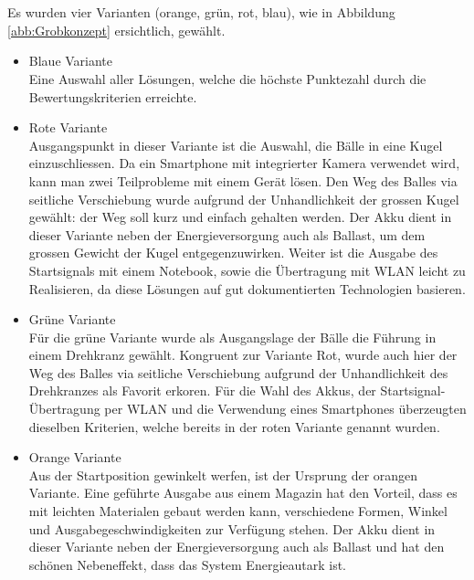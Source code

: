 \\
\\
Es wurden vier Varianten (orange, grün, rot, blau), wie in Abbildung \ref{abb:Grobkonzept} ersichtlich, gewählt. 
\begin{itemize}
	\item Blaue Variante\\
	Eine Auswahl aller Lösungen, welche die höchste Punktezahl durch die Bewertungskriterien erreichte.
	
	\item Rote Variante\\
	Ausgangspunkt in dieser Variante ist die Auswahl, die Bälle in eine Kugel einzuschliessen. Da ein Smartphone mit integrierter Kamera verwendet wird, kann man zwei Teilprobleme mit einem Gerät lösen. Den Weg des Balles via seitliche Verschiebung wurde aufgrund der Unhandlichkeit der grossen Kugel gewählt: der Weg soll kurz und einfach gehalten werden. Der Akku dient in dieser Variante neben der Energieversorgung auch als Ballast, um dem grossen Gewicht der Kugel entgegenzuwirken. Weiter ist die Ausgabe des Startsignals mit einem Notebook, sowie die Übertragung mit WLAN leicht zu Realisieren, da diese Lösungen auf gut dokumentierten Technologien basieren.
	
	\item Grüne Variante\\
	Für die grüne Variante wurde als Ausgangslage der Bälle die Führung in einem Drehkranz gewählt. Kongruent zur Variante Rot, wurde auch hier der Weg des Balles via seitliche Verschiebung aufgrund der Unhandlichkeit des Drehkranzes als Favorit erkoren. Für die Wahl des Akkus, der Startsignal-Übertragung per WLAN und die Verwendung eines Smartphones überzeugten dieselben Kriterien, welche bereits in der roten Variante genannt wurden.
	
	\item Orange Variante\\
	Aus der Startposition gewinkelt werfen, ist der Ursprung der orangen Variante. Eine geführte Ausgabe aus einem Magazin hat den Vorteil, dass es mit leichten Materialen gebaut werden kann, verschiedene Formen, Winkel und Ausgabegeschwindigkeiten zur Verfügung stehen. Der Akku dient in dieser Variante neben der Energieversorgung auch als Ballast und hat den schönen Nebeneffekt, dass das System Energieautark ist.
\end{itemize}

